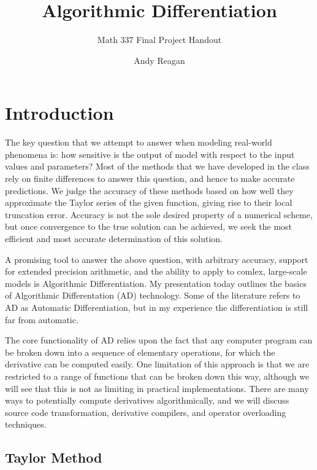 \documentclass[11pt]{article}
\author{Andy Reagan}
\subtitle{Math 337 Final Project Handout}
\title{Algorithmic Differentiation}
\begin{document}

\maketitle

\pagebreak
\tableofcontents

\pagebreak
\section{Introduction}

The key question that we attempt to answer when modeling real-world phenomena is: how sensitive is the output of model with respect to the input values and parameters?
Most of the methods that we have developed in the class rely on finite differences to answer this question, and hence to make accurate predictions.
We judge the accuracy of these methods based on how well they approximate the Taylor series of the given function, giving rise to their local truncation error.
Accuracy is not the sole desired property of a numerical scheme, but once convergence to the true solution can be achieved, we seek the most efficient and most accurate determination of this solution.

A promising tool to answer the above question, with arbitrary accuracy, support for extended precision arithmetic, and the ability to apply to comlex, large-scale models is Algorithmic Differentiation. 
My presentation today outlines the basics of Algorithmic Differentation (AD) technology.
Some of the literature refers to AD as Automatic Differentiation, but in my experience the differentiation is still far from automatic.

The core functionality of AD relies upon the fact that any computer program can be broken down into a sequence of elementary operations, for which the derivative can be computed easily.
One limitation of this approach is that we are restricted to a range of functions that can be broken down this way, although we will see that this is not as limiting in practical implementations.
There are many ways to potentially compute derivatives algorithmically, and we will discuss source code transformation, derivative compilers, and operator overloading techniques.

\subsection{Taylor Method}
\end{document}

